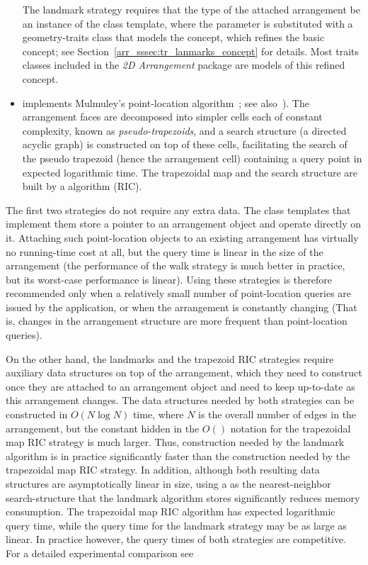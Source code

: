 \begin{itemize}
  The landmark strategy requires that the type of the attached
  arrangement be an instance of the 
  class template, where the  parameter is substituted with
  a geometry-traits class that models the
   concept, which refines the basic
   concept; see
  Section~\ref{arr_sssec:tr_lanmarks_concept} for details. Most traits
  classes included in the \emph{2D Arrangement} package are models of
  this refined concept.
\item {} implements
  Mulmuley's point-location algorithm~\cite{m-fppa-90}; see
  also~\cite[Chapter~6]{bkos-cgaa-00}). The arrangement faces are
  decomposed into simpler cells each of constant complexity, known as
  \emph{pseudo-trapezoids}, and a search structure (a directed acyclic
  graph) is constructed on top of these cells, facilitating the search
  of the pseudo trapezoid (hence the arrangement cell) containing a
  query point in expected logarithmic time. The trapezoidal map and
  the search structure are built by a algorithm (RIC).
\end{itemize}

The first two strategies do not require any extra data. The class
templates that implement them store a pointer to an arrangement object
and operate directly on it. Attaching such point-location objects to
an existing arrangement has virtually no running-time cost at all, but
the query time is linear in the size of the arrangement (the
performance of the walk strategy is much better in practice, but
its worst-case performance is linear). Using these strategies is
therefore recommended only when a relatively small number of
point-location queries are issued by the application, or when the
arrangement is constantly changing (That is, changes in the arrangement
structure are more frequent than point-location queries).

On the other hand, the landmarks and the trapezoid RIC strategies
require auxiliary data structures on top of the arrangement, which
they need to construct once they are attached to an arrangement
object and need to keep up-to-date as this arrangement changes.
The data structures needed by both strategies can be constructed
in $O(N \log N)$ time, where $N$ is the overall number of edges in
the arrangement, but the constant hidden in the $O()$ notation for the
trapezoidal map RIC strategy is much larger. Thus, construction needed
by the landmark algorithm is in practice significantly faster than the
construction needed by the trapezoidal map RIC strategy. In addition,
although both resulting data structures are asymptotically linear in
size, using a \kdtree{} as the nearest-neighbor search-structure that
the landmark algorithm stores significantly reduces memory consumption.
The trapezoidal map RIC algorithm has expected logarithmic query time,
while the query time for the landmark strategy may be as large as
linear. In practice however, the query times of both strategies are
competitive. For a detailed experimental comparison
see~\cite{cgal:hh-eplca-05}

